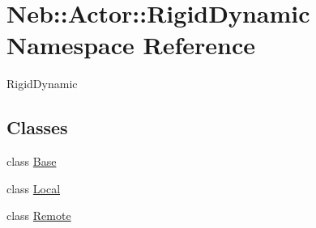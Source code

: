 \hypertarget{namespaceNeb_1_1Actor_1_1RigidDynamic}{\section{\-Neb\-:\-:\-Actor\-:\-:\-Rigid\-Dynamic \-Namespace \-Reference}
\label{namespaceNeb_1_1Actor_1_1RigidDynamic}
}


\-Rigid\-Dynamic  


\subsection*{\-Classes}
\begin{DoxyCompactItemize}
\item 
class \hyperlink{classNeb_1_1Actor_1_1RigidDynamic_1_1Base}{\-Base}
\item 
class \hyperlink{classNeb_1_1Actor_1_1RigidDynamic_1_1Local}{\-Local}
\item 
class \hyperlink{classNeb_1_1Actor_1_1RigidDynamic_1_1Remote}{\-Remote}
\end{DoxyCompactItemize}
